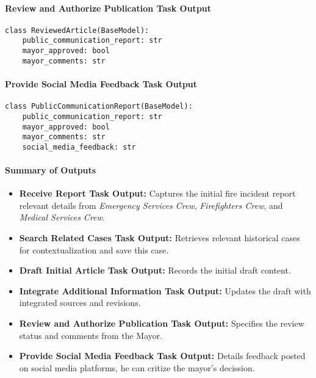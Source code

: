 \paragraph{Review and Authorize Publication Task Output}
\begin{lstlisting}[caption={Pydantic model for Review and Authorize Publication Task Output}]
class ReviewedArticle(BaseModel):
    public_communication_report: str
    mayor_approved: bool
    mayor_comments: str
\end{lstlisting}

\paragraph{Provide Social Media Feedback Task Output}
\begin{lstlisting}[caption={Pydantic model for Provide Social Media Feedback Task Output}]
class PublicCommunicationReport(BaseModel):
    public_communication_report: str
    mayor_approved: bool
    mayor_comments: str
    social_media_feedback: str
\end{lstlisting}

\paragraph{Summary of Outputs}
\begin{itemize}
    \item \textbf{Receive Report Task Output:} Captures the initial fire incident report relevant details from \textit{Emergency Services Crew}, \textit{Firefighters Crew}, and \textit{Medical Services Crew}.
    \item \textbf{Search Related Cases Task Output:} Retrieves relevant historical cases for contextualization and save this case.
    \item \textbf{Draft Initial Article Task Output:} Records the initial draft content.
    \item \textbf{Integrate Additional Information Task Output:} Updates the draft with integrated sources and revisions.
    \item \textbf{Review and Authorize Publication Task Output:} Specifies the review status and comments from the Mayor.
    \item \textbf{Provide Social Media Feedback Task Output:} Details feedback posted on social media platforms, he can critize the mayor's decission.
\end{itemize} 